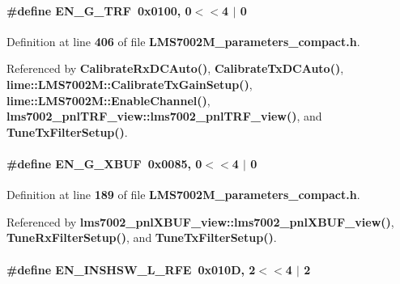 \paragraph[{E\+N\+\_\+\+G\+\_\+\+T\+RF}]{\setlength{\rightskip}{0pt plus 5cm}\#define E\+N\+\_\+\+G\+\_\+\+T\+RF~0x0100, 0$<$$<$4 $\vert$  0}\label{LMS7002M__parameters__compact_8h_a61eec33f2dc37704fdd2fe836aab2215}


Definition at line {\bf 406} of file {\bf L\+M\+S7002\+M\+\_\+parameters\+\_\+compact.\+h}.



Referenced by {\bf Calibrate\+Rx\+D\+C\+Auto()}, {\bf Calibrate\+Tx\+D\+C\+Auto()}, {\bf lime\+::\+L\+M\+S7002\+M\+::\+Calibrate\+Tx\+Gain\+Setup()}, {\bf lime\+::\+L\+M\+S7002\+M\+::\+Enable\+Channel()}, {\bf lms7002\+\_\+pnl\+T\+R\+F\+\_\+view\+::lms7002\+\_\+pnl\+T\+R\+F\+\_\+view()}, and {\bf Tune\+Tx\+Filter\+Setup()}.

\paragraph[{E\+N\+\_\+\+G\+\_\+\+X\+B\+UF}]{\setlength{\rightskip}{0pt plus 5cm}\#define E\+N\+\_\+\+G\+\_\+\+X\+B\+UF~0x0085, 0$<$$<$4 $\vert$  0}\label{LMS7002M__parameters__compact_8h_ab97552e81030a5f54219a23a6fc92788}


Definition at line {\bf 189} of file {\bf L\+M\+S7002\+M\+\_\+parameters\+\_\+compact.\+h}.



Referenced by {\bf lms7002\+\_\+pnl\+X\+B\+U\+F\+\_\+view\+::lms7002\+\_\+pnl\+X\+B\+U\+F\+\_\+view()}, {\bf Tune\+Rx\+Filter\+Setup()}, and {\bf Tune\+Tx\+Filter\+Setup()}.

\paragraph[{E\+N\+\_\+\+I\+N\+S\+H\+S\+W\+\_\+\+L\+\_\+\+R\+FE}]{\setlength{\rightskip}{0pt plus 5cm}\#define E\+N\+\_\+\+I\+N\+S\+H\+S\+W\+\_\+\+L\+\_\+\+R\+FE~0x010\+D, 2$<$$<$4 $\vert$  2}\label{LMS7002M__parameters__compact_8h_a03c2d6b5af48a3d975ae63a1c7dfab8a}


